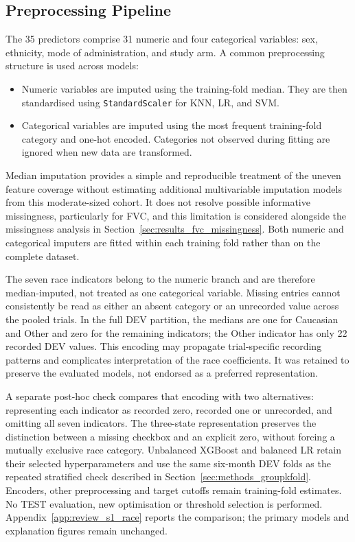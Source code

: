 \subsection{Preprocessing Pipeline}
\label{sec:methods_preprocessing}
The 35 predictors comprise 31 numeric and four categorical variables: sex, ethnicity, mode of administration, and study arm. A common preprocessing structure is used across models:
\begin{itemize}
  \item Numeric variables are imputed using the training-fold median. They are then standardised using \texttt{StandardScaler} for \gls{KNN}, \gls{LR}, and \gls{SVM}.
  \item Categorical variables are imputed using the most frequent training-fold category and one-hot encoded. Categories not observed during fitting are ignored when new data are transformed.
\end{itemize}
Median imputation provides a simple and reproducible treatment of the uneven feature coverage without estimating additional multivariable imputation models from this moderate-sized cohort. It does not resolve possible informative missingness, particularly for FVC, and this limitation is considered alongside the missingness analysis in Section~\ref{sec:results_fvc_missingness}. Both numeric and categorical imputers are fitted within each training fold rather than on the complete dataset.

The seven race indicators belong to the numeric branch and are therefore median-imputed, not treated as one categorical variable. Missing entries cannot consistently be read as either an absent category or an unrecorded value across the pooled trials. In the full DEV partition, the medians are one for Caucasian and Other and zero for the remaining indicators; the Other indicator has only 22 recorded DEV values. This encoding may propagate trial-specific recording patterns and complicates interpretation of the race coefficients. It was retained to preserve the evaluated models, not endorsed as a preferred representation.

A separate post-hoc check compares that encoding with two alternatives: representing each indicator as recorded zero, recorded one or unrecorded, and omitting all seven indicators. The three-state representation preserves the distinction between a missing checkbox and an explicit zero, without forcing a mutually exclusive race category. Unbalanced XGBoost and balanced LR retain their selected hyperparameters and use the same six-month DEV folds as the repeated stratified check described in Section~\ref{sec:methods_groupkfold}. Encoders, other preprocessing and target cutoffs remain training-fold estimates. No TEST evaluation, new optimisation or threshold selection is performed. Appendix~\ref{app:review_s1_race} reports the comparison; the primary models and explanation figures remain unchanged.

